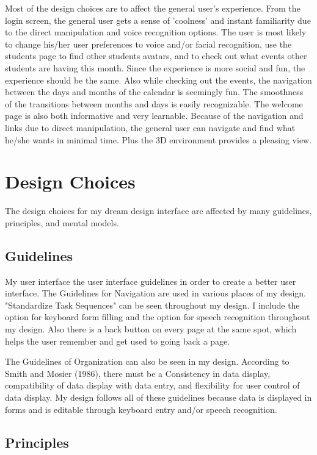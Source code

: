\documentclass{article}
\begin{document}
Most of the design choices are to affect the general user's experience.  From the login screen, the general user gets a sense of 'coolness' and instant familiarity due to the direct manipulation and voice recognition options.  The user is most likely to change his/her user preferences to voice and/or facial recognition, use the students page to find other students avatars, and to check out what events other students are having this month.  Since the experience is more social and fun, the experience should be the same.  Also while checking out the events, the navigation between the days and months of the calendar is seemingly fun.  The smoothness of the transitions between months and days is easily recognizable.  The welcome page is also both informative and very learnable.  Because of the navigation and links due to direct manipulation, the general user can navigate and find what he/she wants in minimal time.  Plus the 3D environment provides a pleasing view.

\section{Design Choices}

The design choices for my dream design interface are affected by many guidelines, principles, and mental models.

\subsection{Guidelines}

My user interface the user interface guidelines in order to create a better user interface.  The Guidelines for Navigation are used in various places of my design.  "Standardize Task Sequences" can be seen throughout my design.  I include the option for keyboard form filling and the option for speech recognition throughout my design.  Also there is a back button on every page at the same spot, which helps the user remember and get used to going back a page. 

The Guidelines of Organization can also be seen in my design.   According to Smith and Mosier (1986), there must be a Consistency in data display, compatibility of data display with data entry, and flexibility for user control of data display.  My design follows all of these guidelines because data is displayed in forms and is editable through keyboard entry and/or speech recognition.

\subsection{Principles}
\end{document}

